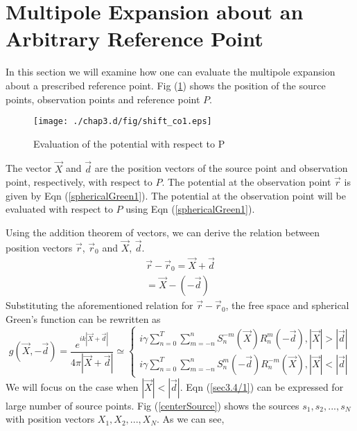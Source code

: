 \section{Multipole Expansion about an Arbitrary Reference Point}
In this section we will examine how one can 
evaluate the multipole expansion about a prescribed reference point. Fig (\ref{helloGroup1}) shows the position of the source points, observation  points  
and reference point $P$. 
\begin{figure}[h!]
\begin{center}
 \texttt{[image: ./chap3.d/fig/shift\_co1.eps]}
\caption{ Evaluation of the potential with respect to P}
\label{helloGroup1}
\end{center}
\end{figure}
The vector  $\vec{X}$ and  $\vec{d}$ are the position vectors of the source point and observation point, respectively, with respect to  $P$.
The potential at the observation point  $\vec{r}$ is given by Eqn (\ref{sphericalGreen1}). The potential at the observation point will be evaluated with respect to $P$ using Eqn (\ref{sphericalGreen1}).
\par Using the addition theorem of vectors, we can derive the relation between position vectors $\vec{r}$, $\vec{r}_0$ and $\vec{X}$, $\vec{d}$. 
\begin{equation}
\label{sec3.5/11}
\begin{split}
\vec{r}-\vec{r}_0 = \vec{X}+\vec{d}\\
= \vec{X}-(-\vec{d})
\end{split}
\end{equation}
Substituting the aforementioned 
relation for $\vec{r}-\vec{r}_0$, the free space and spherical Green's function can be
rewritten as 
\begin{equation}
\label{sec3.4/1}
g(\vec{X},-\vec{d})= \frac{e^{ik|\vec{X}+\vec{d}|}}{4\pi|\vec{X}+\vec{d}|}\simeq \begin{cases} i\gamma\sum_{n=0}^{T}\sum_{m= -n}^{n}S_{n}^{-m}(\vec{X})R_{n}^{m}(-\vec{d}), |\vec{X}| >| \vec{d}|\\
i\gamma \sum_{n=0}^{T}\sum_{m= -n}^{n}S_{n}^{m}(-\vec{d})R_{n}^{-m}(\vec{X}), |\vec{X}| <|\vec{d}|
\end{cases}
\end{equation}
We will focus on the case when $|\vec{X}| <|\vec{d}|$. Eqn (\ref{sec3.4/1}) can be expressed for large number of source points. 
Fig (\ref{centerSource})  shows the  sources $s_{1},s_{2},...,s_{N}$ with position vectors  $X_{1},X_{2},...,X_N$. As we can see,

